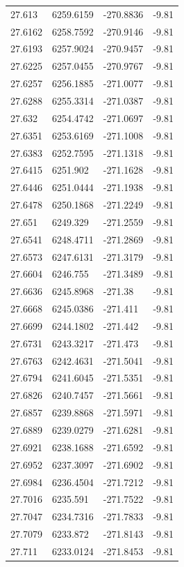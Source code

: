 \begin{table}[H]
\begin{tabular}{llll}
27.613 & 6259.6159 & -270.8836 & -9.81 \\
27.6162 & 6258.7592 & -270.9146 & -9.81 \\
27.6193 & 6257.9024 & -270.9457 & -9.81 \\
27.6225 & 6257.0455 & -270.9767 & -9.81 \\
27.6257 & 6256.1885 & -271.0077 & -9.81 \\
27.6288 & 6255.3314 & -271.0387 & -9.81 \\
27.632 & 6254.4742 & -271.0697 & -9.81 \\
27.6351 & 6253.6169 & -271.1008 & -9.81 \\
27.6383 & 6252.7595 & -271.1318 & -9.81 \\
27.6415 & 6251.902 & -271.1628 & -9.81 \\
27.6446 & 6251.0444 & -271.1938 & -9.81 \\
27.6478 & 6250.1868 & -271.2249 & -9.81 \\
27.651 & 6249.329 & -271.2559 & -9.81 \\
27.6541 & 6248.4711 & -271.2869 & -9.81 \\
27.6573 & 6247.6131 & -271.3179 & -9.81 \\
27.6604 & 6246.755 & -271.3489 & -9.81 \\
27.6636 & 6245.8968 & -271.38 & -9.81 \\
27.6668 & 6245.0386 & -271.411 & -9.81 \\
27.6699 & 6244.1802 & -271.442 & -9.81 \\
27.6731 & 6243.3217 & -271.473 & -9.81 \\
27.6763 & 6242.4631 & -271.5041 & -9.81 \\
27.6794 & 6241.6045 & -271.5351 & -9.81 \\
27.6826 & 6240.7457 & -271.5661 & -9.81 \\
27.6857 & 6239.8868 & -271.5971 & -9.81 \\
27.6889 & 6239.0279 & -271.6281 & -9.81 \\
27.6921 & 6238.1688 & -271.6592 & -9.81 \\
27.6952 & 6237.3097 & -271.6902 & -9.81 \\
27.6984 & 6236.4504 & -271.7212 & -9.81 \\
27.7016 & 6235.591 & -271.7522 & -9.81 \\
27.7047 & 6234.7316 & -271.7833 & -9.81 \\
27.7079 & 6233.872 & -271.8143 & -9.81 \\
27.711 & 6233.0124 & -271.8453 & -9.81 \\

\end{tabular}
\end{table}
